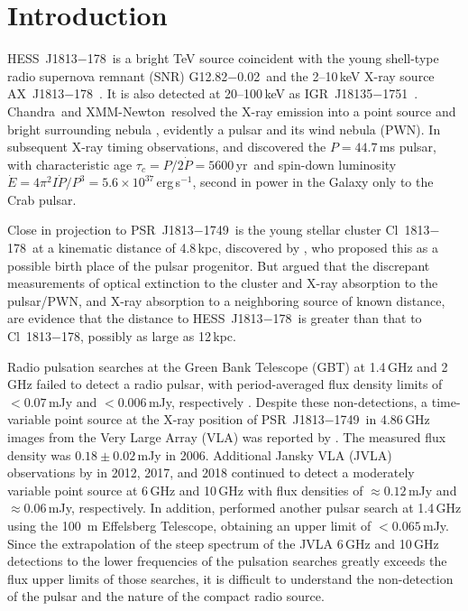 \documentclass[twocolumn]{aastex62}
\newcommand\chandra{{Chandra}}
\newcommand\xmm{{XMM-Newton}}
\newcommand\snr{G12.82$-$0.02}
\newcommand\tev{HESS~J1813$-$178}
\newcommand\igr{IGR~J18135$-$1751}
\newcommand\psr{PSR~J1813$-$1749}
\newcommand\asrc{AX~J1813$-$178}
\newcommand\cl{Cl~1813$-$178}
\newcommand\tauc{$\tau_c=P/2\dot P=5600$\,yr}
\newcommand\edot{$\dot E=4\pi^2I\dot P/P^3=5.6\times10^{37}$\,erg\,s$^{-1}$}
\begin{document}
\section{Introduction\label{sec:intro}}

\tev\ is a bright TeV source \citep{aha05,aha06} coincident with
the young shell-type radio supernova remnant (SNR) \snr\ and the
2--10\,keV X-ray source \asrc\ \citep{bro05}.  It is also detected
at 20--100\,keV as \igr\ \citep{ube05}.  \chandra\ and \xmm\ resolved
the X-ray emission into a point source and bright surrounding nebula
\citep{fun07,hel07}, evidently a pulsar and its wind nebula (PWN).
In subsequent X-ray timing observations, \citet{got09} and \citet{hal12}
discovered the $P=44.7$\,ms pulsar, with characteristic age \tauc\ and
spin-down luminosity \edot, second in power in the Galaxy only to
the Crab pulsar.

Close in projection to \psr\ is the young stellar cluster \cl\ at
a kinematic distance of 4.8\,kpc, discovered by \citet{mes08,mes11},
who proposed this as a possible birth place of the pulsar progenitor.
But \citet{hal12} argued that the discrepant measurements of optical
extinction to the cluster and X-ray absorption to the pulsar/PWN,
and X-ray absorption to a neighboring source of known distance, are
evidence that the distance to \tev\ is greater than that to \cl,
possibly as large as 12\,kpc.

Radio pulsation searches at the Green Bank Telescope (GBT) at
1.4\,GHz and 2\,GHz failed to detect a radio pulsar, with period-averaged
flux density limits of $<0.07$\,mJy and $<0.006$\,mJy, respectively
\citep{hal12}.  Despite these non-detections, a time-variable point
source at the X-ray position of \psr\ in 4.86\,GHz images from the
Very Large Array (VLA) was reported by \citet{dzi10}.  The measured
flux density was $0.18 \pm 0.02$\,mJy in 2006.  Additional Jansky
VLA (JVLA) observations by \citet{dzi18} in 2012, 2017, and 2018
continued to detect a moderately variable point source at 6\,GHz
and 10\,GHz with flux densities of $\approx0.12$\,mJy and
$\approx0.06$\,mJy, respectively.  In addition, \citet{dzi18}
performed another pulsar search at 1.4\,GHz using the 100~m Effelsberg
Telescope, obtaining an upper limit of $<0.065$\,mJy.  Since the
extrapolation of the steep spectrum of the JVLA 6\,GHz and 10\,GHz
detections to the lower frequencies of the pulsation searches greatly
exceeds the flux upper limits of those searches, it is difficult
to understand the non-detection of the pulsar and the nature of the
compact radio source.
\end{document}
